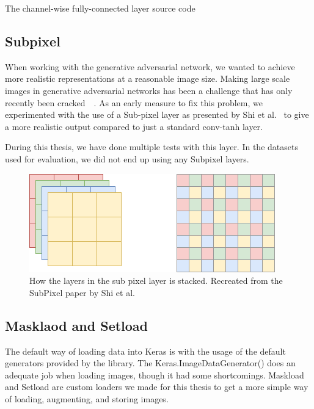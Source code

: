 \begin{minipage}{\linewidth}
\begin{listing}

\caption{The channel-wise fully-connected layer source code}
\label{listing:CWDense}
\end{listing}
\end{minipage}

\subsection{Subpixel}
When working with the generative adversarial network, we wanted to achieve more realistic representations at a reasonable image size. 
Making large scale images in generative adversarial networks has been a challenge that has only recently been cracked~\cite{DBLP:journals/corr/DentonCSF15}~\cite{DBLP:journals/corr/abs-1809-11096}.
As an early measure to fix this problem, we experimented with the use of a Sub-pixel layer as presented by Shi et al.~\cite{DBLP:journals/corr/ShiCHTABRW16} to give a more realistic output compared to just a standard conv-tanh layer.

During this thesis, we have done multiple tests with this layer. In the datasets used for evaluation, we did not end up using any Subpixel layers.

\begin{figure}
\centering
\includegraphics[scale=0.8]{methodology/figures/SubPixel.png}
\caption{How the layers in the sub pixel layer is stacked. Recreated from the SubPixel paper by Shi et al.~\cite{DBLP:journals/corr/ShiCHTABRW16}}
\label{fig:SubPixel}
\end{figure}


\subsection{Masklaod and Setload}
The default way of loading data into Keras is with the usage of the default generators provided by the library. The Keras.ImageDataGenerator() does an adequate job when loading images, though it had some shortcomings.
Maskload and Setload are custom loaders we made for this thesis to get a more simple way of loading, augmenting, and storing images.

